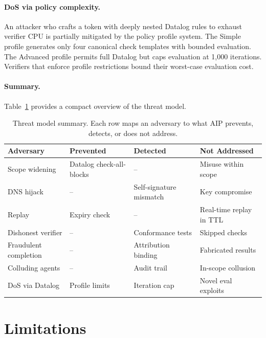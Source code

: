 \documentclass[11pt,a4paper]{article}
\newcommand{\aip}{\textsc{AIP}}
\begin{document}
\paragraph{DoS via policy complexity.} An attacker who crafts a token with deeply nested Datalog rules to exhaust verifier CPU is partially mitigated by the policy profile system. The Simple profile generates only four canonical check templates with bounded evaluation. The Advanced profile permits full Datalog but caps evaluation at 1,000 iterations. Verifiers that enforce profile restrictions bound their worst-case evaluation cost.

\paragraph{Summary.} Table~\ref{tab:threat-summary} provides a compact overview of the threat model.

\begin{table}[t]
\centering
\caption{Threat model summary. Each row maps an adversary to what \aip{} prevents, detects, or does not address.}
\label{tab:threat-summary}
\footnotesize
\setlength{\tabcolsep}{3pt}
\begin{tabular}{@{}p{2.4cm}p{1.8cm}p{1.8cm}p{1.8cm}@{}}
\toprule
\textbf{Adversary} & \textbf{Prevented} & \textbf{Detected} & \textbf{Not Addressed} \\
\midrule
Scope widening      & Datalog check-all-blocks & --          & Misuse within scope \\
DNS hijack          & --          & Self-signature mismatch & Key compromise \\
Replay              & Expiry check & --          & Real-time replay in TTL \\
Dishonest verifier  & --          & Conformance tests & Skipped checks \\
Fraudulent completion & --        & Attribution binding & Fabricated results \\
Colluding agents    & --          & Audit trail & In-scope collusion \\
DoS via Datalog     & Profile limits & Iteration cap & Novel eval exploits \\
\bottomrule
\end{tabular}
\end{table}

\section{Limitations}
\label{sec:limitations}
\end{document}
